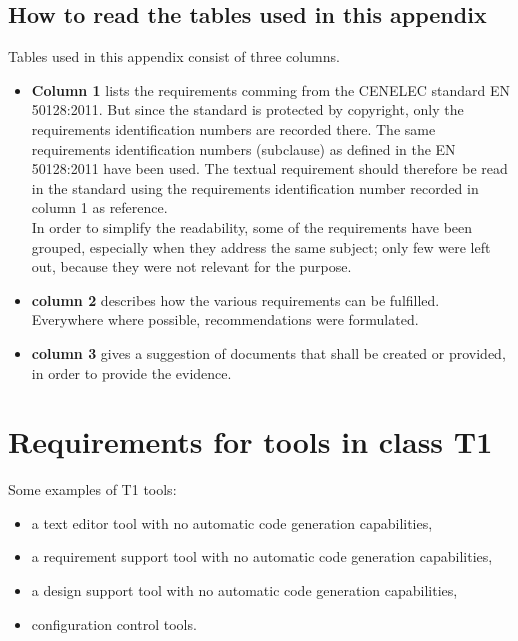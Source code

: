 \documentclass{template/openetcs_report}
\begin{document}
\subsection{How to read the tables used in this appendix}
Tables used in this appendix consist of three columns.
\begin{itemize}\itemsep=0pt
  \item \textbf{Column 1} lists the requirements comming from the CENELEC standard EN 50128:2011. But since the standard is protected by copyright, only the requirements identification numbers are recorded there. The same requirements identification numbers (subclause) as defined in the EN 50128:2011 have been used. The textual requirement should therefore be read in the standard using the requirements identification number recorded in column 1 as reference.\\
In order to simplify the readability, some of the requirements have been grouped, especially when they address the same subject; only few were left out, because they were not relevant for the purpose.
  \item \textbf{column 2} describes how the various requirements can be fulfilled. Everywhere where possible, recommendations were formulated.
  \item \textbf{column 3} gives a suggestion of documents that shall be created or provided, in order to provide the evidence.
\end{itemize}



\section{Requirements for tools in class T1}
\label{T1}
Some examples of T1 tools:
\begin{itemize}\itemsep=0pt
  \item a text editor tool with no automatic code generation capabilities,
  \item a requirement support tool with no automatic code generation capabilities,
  \item a design support tool with no automatic code generation capabilities,
  \item configuration control tools.
\end{itemize}
\end{document}
